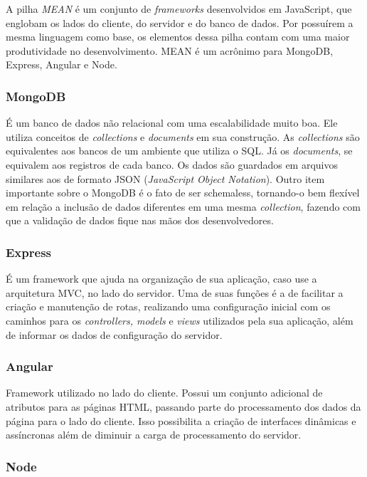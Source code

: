 \documentclass[
	12pt,				%
	oneside,			%
	a4paper,			%
	brazil				%
]{abntex2}
\begin{document}
A pilha \textit{MEAN} é um conjunto de \textit{frameworks} desenvolvidos em JavaScript, que englobam os lados do cliente, do servidor e do banco de dados. Por possuírem a mesma linguagem como base, os elementos dessa pilha contam com uma maior produtividade no desenvolvimento. MEAN é um acrônimo para MongoDB, Express, Angular e Node.


\subsubsection{MongoDB}

É um banco de dados não relacional com uma escalabilidade muito boa. Ele utiliza conceitos de \textit{collections} e \textit{documents} em sua construção. 
As \textit{collections} são equivalentes aos bancos de um ambiente que utiliza o SQL. Já os \textit{documents}, se equivalem aos registros de cada banco.
Os dados são guardados em arquivos similares aos de formato JSON (\textit{JavaScript Object Notation}).
Outro item importante sobre o MongoDB é o fato de ser schemaless, tornando-o bem flexível em relação a inclusão de dados diferentes em uma mesma \textit{collection}, fazendo com que a validação de dados fique nas mãos dos desenvolvedores.


\subsubsection{Express}

É um framework que ajuda na organização de sua aplicação, caso use a arquitetura MVC, no lado do servidor. Uma de suas funções é a de facilitar a criação e manutenção de rotas, realizando uma configuração inicial com os caminhos para os \textit{controllers, models} e \textit{views} utilizados pela sua aplicação, além de informar os dados de configuração do servidor.


\subsubsection{Angular}

Framework utilizado no lado do cliente. Possui um conjunto adicional de atributos para as páginas HTML, passando parte do processamento dos dados da página para o lado do cliente. Isso possibilita a criação de interfaces dinâmicas e assíncronas além de diminuir a carga de processamento do servidor.


\subsubsection{Node}
\end{document}

